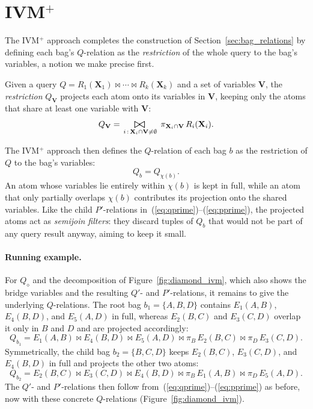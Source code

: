 \section{IVM$^+$}
\label{sec:ivm_algorithm}

The IVM$^+$ approach completes the construction of Section~\ref{sec:bag_relations} by defining each bag's $Q$-relation as the \emph{restriction} of the whole query to the bag's variables, a notion we make precise first.

Given a query $Q = R_1(\mathbf{X}_1) \bowtie \cdots \bowtie R_k(\mathbf{X}_k)$ and a set of variables $\mathbf{V}$, the \emph{restriction} $Q_{\mathbf{V}}$ projects each atom onto its variables in $\mathbf{V}$, keeping only the atoms that share at least one variable with $\mathbf{V}$:
\[
    Q_{\mathbf{V}} = \bigbowtie_{\,i\,:\,\mathbf{X}_i \cap \mathbf{V} \neq \emptyset} \;\pi_{\mathbf{X}_i \cap \mathbf{V}}\, R_i(\mathbf{X}_i).
\]

\medskip

The IVM$^+$ approach then defines the $Q$-relation of each bag $b$ as the restriction of $Q$ to the bag's variables:
\begin{equation}
    Q_b = Q_{\chi(b)}. \label{eq:qrel}
\end{equation}
An atom whose variables lie entirely within $\chi(b)$ is kept in full, while an atom that only partially overlaps $\chi(b)$ contributes its projection onto the shared variables.
Like the child $P'$-relations in~(\ref{eq:qprime})--(\ref{eq:pprime}), the projected atoms act as \emph{semijoin filters}: they discard tuples of $Q_b$ that would not be part of any query result anyway, aiming to keep it small.

\paragraph{Running example.}
For $Q_\diamond$ and the decomposition of Figure~\ref{fig:diamond_ivm}, which also shows the bridge variables and the resulting $Q'$- and $P'$-relations, it remains to give the underlying $Q$-relations. The root bag $b_1 = \{A,B,D\}$ contains $E_1(A,B)$, $E_4(B,D)$, and $E_5(A,D)$ in full, whereas $E_2(B,C)$ and $E_3(C,D)$ overlap it only in $B$ and $D$ and are projected accordingly:
\[
    Q_{b_1} = E_1(A,B) \bowtie E_4(B,D) \bowtie E_5(A,D) \bowtie \pi_{B}\,E_2(B,C) \bowtie \pi_{D}\,E_3(C,D).
\]
Symmetrically, the child bag $b_2 = \{B,C,D\}$ keeps $E_2(B,C)$, $E_3(C,D)$, and $E_4(B,D)$ in full and projects the other two atoms:
\[
    Q_{b_2} = E_2(B,C) \bowtie E_3(C,D) \bowtie E_4(B,D) \bowtie \pi_{B}\,E_1(A,B) \bowtie \pi_{D}\,E_5(A,D).
\]
The $Q'$- and $P'$-relations then follow from~(\ref{eq:qprime})--(\ref{eq:pprime}) as before, now with these concrete $Q$-relations (Figure~\ref{fig:diamond_ivm}).


